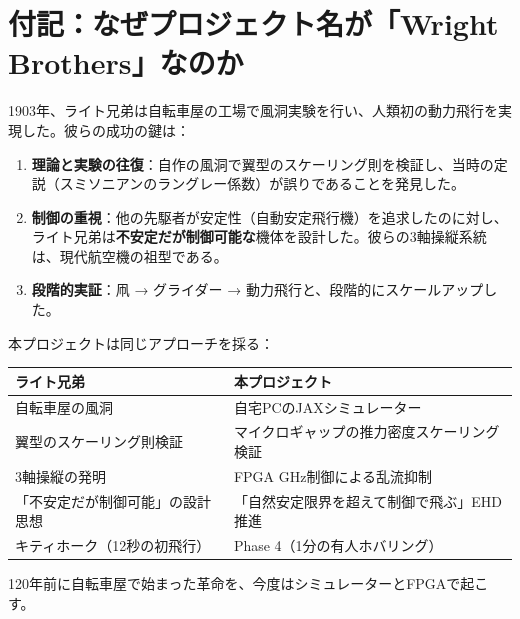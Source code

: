 \documentclass[12pt,a4paper]{ltjsarticle}
\begin{document}
\newpage
\section*{付記：なぜプロジェクト名が「Wright Brothers」なのか}

1903年、ライト兄弟は自転車屋の工場で風洞実験を行い、人類初の動力飛行を実現した。彼らの成功の鍵は：

\begin{enumerate}[leftmargin=2em]
  \item \textbf{理論と実験の往復}：自作の風洞で翼型のスケーリング則を検証し、当時の定説（スミソニアンのラングレー係数）が誤りであることを発見した。
  \item \textbf{制御の重視}：他の先駆者が安定性（自動安定飛行機）を追求したのに対し、ライト兄弟は\textbf{不安定だが制御可能な}機体を設計した。彼らの3軸操縦系統は、現代航空機の祖型である。
  \item \textbf{段階的実証}：凧 → グライダー → 動力飛行と、段階的にスケールアップした。
\end{enumerate}

本プロジェクトは同じアプローチを採る：

\begin{center}
\sffamily
\begin{tabular}{@{}ll@{}}
\toprule
\textbf{ライト兄弟} & \textbf{本プロジェクト} \\
\midrule
自転車屋の風洞 & 自宅PCのJAXシミュレーター \\
翼型のスケーリング則検証 & マイクロギャップの推力密度スケーリング検証 \\
3軸操縦の発明 & FPGA GHz制御による乱流抑制 \\
「不安定だが制御可能」の設計思想 & 「自然安定限界を超えて制御で飛ぶ」EHD推進 \\
キティホーク（12秒の初飛行） & Phase 4（1分の有人ホバリング） \\
\bottomrule
\end{tabular}
\end{center}

\vspace{1cm}

120年前に自転車屋で始まった革命を、今度はシミュレーターとFPGAで起こす。
\end{document}
